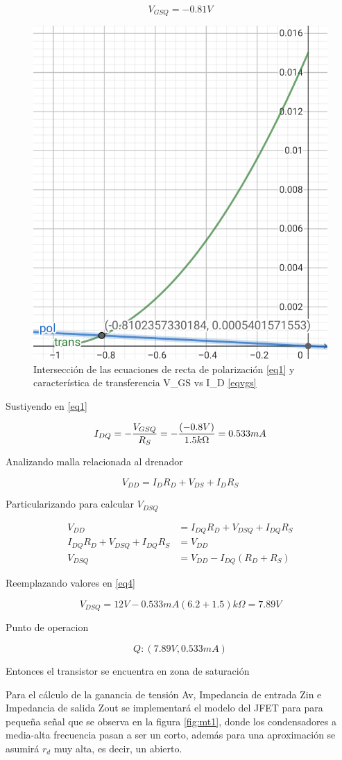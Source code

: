 \documentclass[12pt, a4paper]{article}
\begin{document}
    $$V_{GSQ} = -0.81V$$

    \begin{figure}[h!]
        \centering
        \includegraphics[height=5cm\textwidth]{grafQ.png}
        \caption{Intersección de las ecuaciones de recta de polarización \eqref{eq1} y característica de transferencia V_{GS} vs I_D \eqref{eqvgs}}
        \label{fig:vgsq}
    \end{figure}

    Sustiyendo en \eqref{eq1}

    $$I_{DQ} = -{V_{GSQ} \over R_S} = -{(-0.8V) \over 1.5k\Omega} = 0.533mA$$

    Analizando malla relacionada al drenador

    $$V_{DD} = I_DR_D + V_{DS} + I_DR_S$$

    Particularizando para calcular $V_{DSQ}$

    \begin{equation}
        \label{eq4}
        \begin{split}
            V_{DD} & = I_{DQ}R_D + V_{DSQ} + I_{DQ}R_S \\
            I_{DQ}R_D + V_{DSQ} + I_{DQ}R_S & = V_{DD} \\
            V_{DSQ} & = V_{DD} - I_{DQ}(R_D + R_S)
        \end{split}
    \end{equation}
    
    Reemplazando valores en \eqref{eq4}

    $$V_{DSQ} = 12V - 0.533mA(6.2 + 1.5)k\Omega = 7.89V$$

    Punto de operacion

    $$Q : (7.89V, 0.533mA)$$

    Entonces el transistor se encuentra en zona de saturación
    
    Para el cálculo de la ganancia de tensión Av, Impedancia de entrada Zin e Impedancia de salida Zout se implementará el modelo del JFET para para pequeña señal que se observa en la figura \ref{fig:mt1}, donde los condensadores a media-alta frecuencia pasan a ser un corto, además para una aproximación se asumirá $r_d$ muy alta, es decir, un abierto.
\end{document}
